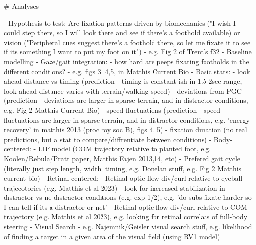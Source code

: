 # Analyses

- Hypothesis to test: Are fixation patterns driven by biomechanics ("I wish I could step there, so I will look there and see if there's a foothold available) or vision ("Peripheral cues suggest there's a foothold there, so let me fixate it to see if its something I want to put my foot on it")
  - e.g. Fig 2 of Trent's f32
- Baseline modelling
  - Gaze/gait integration:
    - how hard are peeps fixating footholds in the different conditions?
        - e.g. figs 3, 4,5, in Matthis Current Bio
  - Basic stats:
    - look ahead distance vs timing (prediction - timing is constant-ish in 1.5-2sec range, look ahead distance varies with terrain/walking speed)
    - deviations from PGC (prediction - deviations are larger in sparse terrain, and in distractor conditions, e.g. Fig 2 Matthis Current Bio)
    - speed fluctuations (prediction - speed fluctuations are larger in sparse terrain, and in distractor conditions, e.g. 'energy recovery' in matthis 2013 (proc roy soc B), figs 4, 5)
    - fixation duration (no real predictions, but a stat to compare/diffrentiate between conditions)
  - Body-centered:
      - LIP model (COM trajectory relative to planted foot, e.g. Koolen/Rebula/Pratt paper, Matthis Fajen 2013,14, etc)
      - Prefered gait cycle (literally just step length, width, timing, e.g. Donelan stuff, e.g. Fig 2 Matthis current bio)
  - Retinal-centered:
      - Retinal optic flow div/curl relative to eyeball trajecotories (e.g. Matthis et al 2023)
        - look for increased stabilization in distractor vs no-distractor conditions (e.g. exp 1/2), e.g. 'do subs fixate harder so I can tell if its a distractor or not'
        - Retinal optic flow div/curl relative to COM trajectory (e.g. Matthis et al 2023), e.g. looking for retinal correlats of full-body steering
      - Visual Search - e.g. Najemnik/Geisler visual search stuff, e.g. likelihood of finding a target in a given area of the visual field (using RV1 model)




